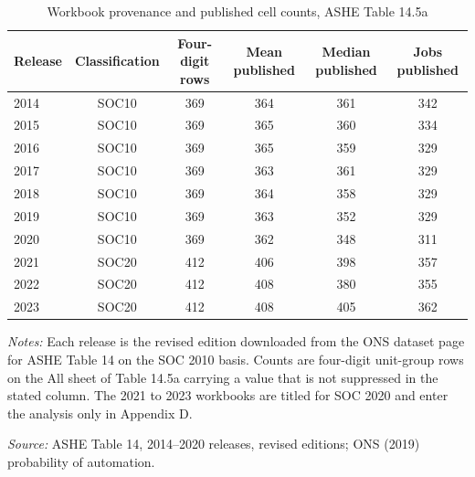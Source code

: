 \begin{table}[!ht]\centering
\caption{Workbook provenance and published cell counts, ASHE Table 14.5a}\label{tab:prov}
\begin{threeparttable}\footnotesize\setlength{\tabcolsep}{4pt}
\begin{tabular}{lccccc}\toprule
Release & Classification & Four-digit rows & Mean published & Median published & Jobs published \\ \midrule
2014 & SOC10 & 369 & 364 & 361 & 342 \\
2015 & SOC10 & 369 & 365 & 360 & 334 \\
2016 & SOC10 & 369 & 365 & 359 & 329 \\
2017 & SOC10 & 369 & 363 & 361 & 329 \\
2018 & SOC10 & 369 & 364 & 358 & 329 \\
2019 & SOC10 & 369 & 363 & 352 & 329 \\
2020 & SOC10 & 369 & 362 & 348 & 311 \\
2021 & SOC20 & 412 & 406 & 398 & 357 \\
2022 & SOC20 & 412 & 408 & 380 & 355 \\
2023 & SOC20 & 412 & 408 & 405 & 362 \\
\bottomrule\end{tabular}
\begin{tablenotes}\footnotesize
\item \emph{Notes:} Each release is the revised edition downloaded from the ONS dataset page for ASHE Table 14 on the SOC 2010 basis. Counts are four-digit unit-group rows on the All sheet of Table 14.5a carrying a value that is not suppressed in the stated column. The 2021 to 2023 workbooks are titled for SOC 2020 and enter the analysis only in Appendix D.
\item \emph{Source:} ASHE Table 14, 2014--2020 releases, revised editions; ONS (2019) probability of automation.
\end{tablenotes}\end{threeparttable}\end{table}
